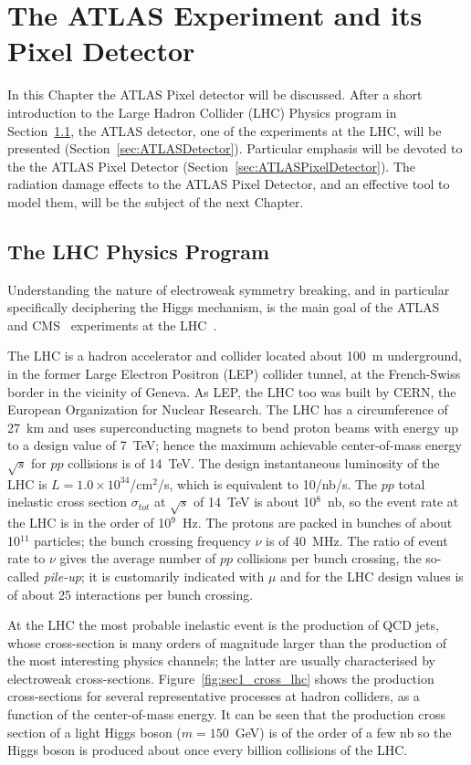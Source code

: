 \chapter{The ATLAS Experiment and its Pixel Detector}
\label{chap:ATLAS}

In this Chapter the ATLAS Pixel detector will be discussed.
After a short introduction to the Large Hadron Collider (LHC) Physics program in 
Section~\ref{sec:LHCPhysics}, the ATLAS detector, one of the experiments at the LHC, will be 
presented (Section~\ref{sec:ATLASDetector}). Particular emphasis will be devoted to the 
the ATLAS Pixel Detector (Section~\ref{sec:ATLASPixelDetector}). 
The radiation damage effects to the ATLAS Pixel Detector, and an effective tool to model them, will be 
the subject of the next  Chapter.

\section{The LHC Physics Program}
\label{sec:LHCPhysics}
Understanding the nature of electroweak symmetry breaking, and in particular  specifically 
deciphering the Higgs mechanism, is the main goal of the ATLAS~\cite{AtlasDetector} and 
CMS~\cite{CMSDetector} experiments at the LHC~\cite{LHCMachine}. 

The LHC is a hadron accelerator and collider located about 100~m underground, in the former 
Large Electron Positron (LEP) collider tunnel, at the French-Swiss border in the vicinity of Geneva. As LEP, 
the LHC too was built by CERN, the European 
Organization for Nuclear Research. The LHC has a circumference of 27~km and uses 
superconducting magnets to bend proton beams with energy up to a design value of 7~TeV; hence 
the maximum achievable center-of-mass energy $\sqrt{s}$ for $pp$ collisions is of 14~TeV. The design instantaneous 
luminosity of the LHC is  $L=1.0\times10^{34}$/cm$^{2}$/s, which is equivalent to 10/nb/s. 
The $pp$ total inelastic  cross section $\sigma_{tot}$ at $\sqrt{s}$ of 14~TeV is about 10$^8$~nb, 
so the event rate at the LHC is in the order of 10$^9$~Hz. 
The protons are packed in bunches of about 10$^{11}$ particles; the bunch crossing frequency $\nu$ is 
of 40~MHz.  The ratio of event rate to $\nu$ gives the average number of $pp$ collisions per 
bunch crossing, the so-called {\it pile-up}; it is customarily indicated with $\mu$ and for the LHC 
design values is of about 25 interactions per bunch crossing.

At the LHC the most probable inelastic event is the production of QCD jets, whose   cross-section is  many orders of magnitude larger than the production of the
most interesting physics
channels; the latter are usually characterised by electroweak cross-sections. Figure~\ref{fig:sec1_cross_lhc} shows the production cross-sections for several
representative processes at hadron colliders, as a function of the center-of-mass energy.
It can be seen that the  production cross section of a light Higgs boson ($m=150$~GeV) is of the order of a 
few  nb so the Higgs boson is produced about once every billion collisions of the LHC.

